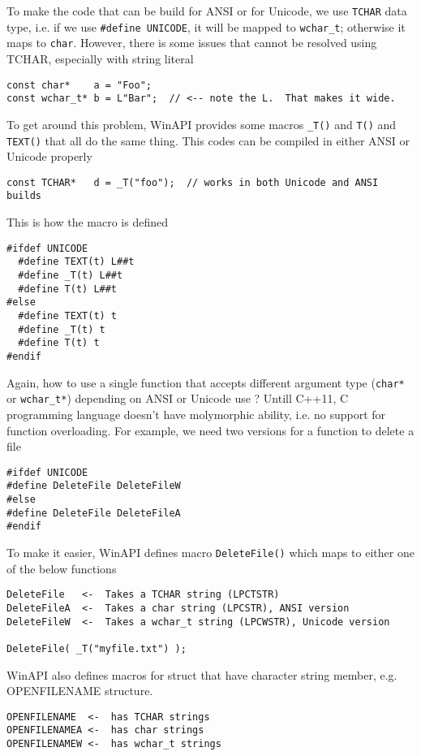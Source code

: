 To make the code that can be build for ANSI or for Unicode, we use \verb!TCHAR!
data type, i.e. if we use \verb!#define UNICODE!, it
will be mapped to  \verb!wchar_t!; otherwise it maps to \verb!char!. However,
there is some issues that cannot be resolved using TCHAR, especially with string
literal
\begin{verbatim}
const char*    a = "Foo";
const wchar_t* b = L"Bar";  // <-- note the L.  That makes it wide. 
\end{verbatim}
To get around this problem, WinAPI provides some macros \verb!_T()! and
\verb!T()! and \verb!TEXT()! that all do the same thing. This codes can be
compiled in either ANSI or Unicode properly
\begin{Verbatim}
const TCHAR*   d = _T("foo");  // works in both Unicode and ANSI builds
\end{Verbatim}
This is how the macro is defined
\begin{Verbatim}
#ifdef UNICODE
  #define TEXT(t) L##t
  #define _T(t) L##t
  #define T(t) L##t
#else
  #define TEXT(t) t
  #define _T(t) t
  #define T(t) t
#endif
\end{Verbatim}

Again, how to use a single function that accepts different argument type
(\verb!char*! or \verb!wchar_t*!) depending on ANSI or Unicode use ? Untill
C++11, C programming language doesn't have molymorphic ability, i.e. no support
for function overloading. For example, we need two versions for a function to
delete a file
\begin{verbatim}
#ifdef UNICODE
#define DeleteFile DeleteFileW
#else
#define DeleteFile DeleteFileA
#endif

\end{verbatim}
To make it easier, WinAPI defines macro \verb!DeleteFile()! which maps to either
one of the below functions
\begin{verbatim}
DeleteFile   <-  Takes a TCHAR string (LPCTSTR)
DeleteFileA  <-  Takes a char string (LPCSTR), ANSI version
DeleteFileW  <-  Takes a wchar_t string (LPCWSTR), Unicode version

DeleteFile( _T("myfile.txt") );   
\end{verbatim}


WinAPI also defines macros for struct that have character string member, e.g. OPENFILENAME
structure. 
\begin{verbatim}
OPENFILENAME  <-  has TCHAR strings
OPENFILENAMEA <-  has char strings
OPENFILENAMEW <-  has wchar_t strings
\end{verbatim}

